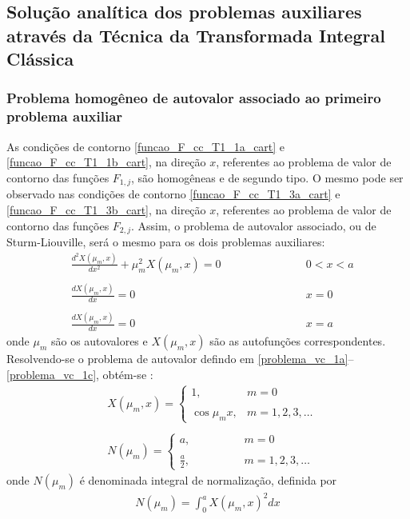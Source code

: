 \subsection{Solução analítica dos problemas auxiliares através da Técnica da Transformada Integral Clássica}

\subsubsection{Problema homogêneo de autovalor associado ao primeiro problema auxiliar}

As condições de contorno \eqref{funcao_F_cc_T1_1a_cart} e \eqref{funcao_F_cc_T1_1b_cart}, na direção $x$, referentes ao problema de valor de contorno das funções $F_{1, j}$, são homogêneas e de segundo tipo. O
mesmo pode ser observado nas condições de contorno \eqref{funcao_F_cc_T1_3a_cart} e \eqref{funcao_F_cc_T1_3b_cart}, na direção $x$, referentes ao problema de valor de contorno das funções $F_{2, j}$.
Assim, o problema de autovalor associado, ou de Sturm-Liouville, será o mesmo para os dois problemas auxiliares:
\begin{subequations}
	\begin{alignat}{2}
	& \frac{d^2 X(\mu_m, x)}{d x^2} + \mu_m^2 X(\mu_m, x) = 0 \quad\quad\quad\quad\quad\quad && 0 < x < a \label{problema_vc_1a} \\ \nonumber \\
	& \frac{d X(\mu_m, x)}{d x} = 0 && x = 0 \label{problema_vc_1b} \\ \nonumber \\
	& \frac{d X(\mu_m, x)}{d x} = 0 && x = a \label{problema_vc_1c}
	\end{alignat}
\end{subequations}
onde $\mu_m$ são os autovalores e $X(\mu_m, x)$ são as autofunções correspondentes. Resolvendo-se o problema de autovalor defindo em \eqref{problema_vc_1a}--\eqref{problema_vc_1c}, obtém-se \citep{livro_ozisik}:
\begin{align}
& X(\mu_m, x) = \left\lbrace
\begin{array}{ll}
1, & m = 0 \\ \\
\cos \mu_m x, & m = 1,2,3,\ldots
\end{array}
\right . \label{definicao_das_autofuncoes} \\ \nonumber \\
& N(\mu_m) = \left\lbrace
\begin{array}{ll}
a, \quad\quad\quad\quad & m = 0 \\ \\
\displaystyle\frac{a}{2}, & m = 1,2,3,\ldots
\end{array}
\right. \label{valor_integral_norm}
\end{align}
onde $N(\mu_m)$ é denominada integral de normalização, definida por
\begin{align}
N(\mu_m) = \int_0^a X(\mu_m, x)^2 dx
\end{align}

